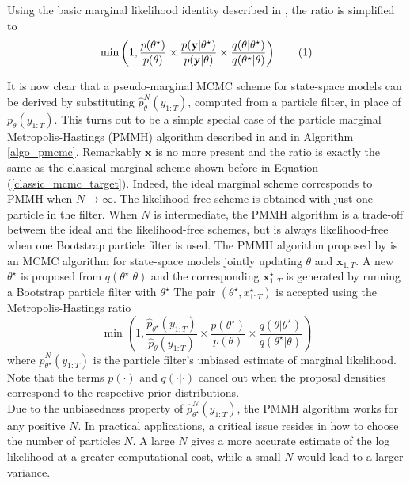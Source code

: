 \documentclass[11pt,a4,twosided,singlespacing,titlepagenumber=on]{scrreprt}
\numberwithin{equation}{chapter} %
\theoremstyle{remark}
\newcommand{\matr}[1]{\mathbf{#1}}
\newcommand\numberthis{\addtocounter{equation}{1}\tag{\theequation}}
\begin{document}
Using the basic marginal likelihood identity described in \cite{chib1995}, the ratio is simplified to
\begin{align*}
 \min \left(1, \frac{p(\theta^\star)}{p(\theta)}  \times \frac{p(\matr{y}|\theta^\star)}{p(\matr{y}|\theta)} \times \frac{q(\theta|\theta^\star)}{q(\theta^\star|\theta)} \right) \numberthis
\end{align*}

It is now clear that a pseudo-marginal MCMC scheme for state-space models can be derived by substituting $\hat{p}^N_{\theta}(y_{1:T})$, computed from a particle filter, in place of $p_{\theta}(y_{1:T})$. This turns out to be a simple special case of the particle marginal Metropolis-Hastings (PMMH) algorithm described in \cite{andrieu2010} and in Algorithm \ref{algo_pmcmc}. Remarkably $\matr{x}$ is no more present and the ratio is exactly the same as the classical marginal scheme shown before in Equation (\ref{classic_mcmc_target}). Indeed, the ideal marginal scheme corresponds to PMMH when $N \rightarrow \infty$. The likelihood-free scheme is obtained with just one particle in the filter. When $N$ is intermediate, the PMMH algorithm is a trade-off between the ideal and the likelihood-free schemes, but is always likelihood-free when one Bootstrap particle filter is used. The PMMH algorithm proposed by \cite{andrieu2010} is an MCMC algorithm for state-space models jointly updating $\theta$ and $\matr{x}_{1:T}$. A new $\theta^\star$ is proposed from $q(\theta^\star|\theta)$  and the corresponding $\matr{x}_{1:T}^\star$ is generated by running a Bootstrap particle filter with $\theta^\star$ The pair $(\theta^\star,x_{1:T}^\star)$ is accepted using the Metropolis-Hastings ratio
\begin{equation}
\min \left(1, \frac{\hat{p}_{\theta^\star}(y_{1:T})}{\hat{p}_{\theta}(y_{1:T})} \times \frac{p(\theta^\star)}{p(\theta)} \times \frac{q(\theta|\theta^\star)}{q(\theta^\star|\theta)} \right)
\end{equation} 
where $\hat{p}^N_{\theta^\star}(y_{1:T})$ is the particle filter's unbiased estimate of marginal likelihood. Note that the terms $p(\cdot)$ and $q(\cdot|\cdot)$ cancel out when the proposal densities correspond to the respective prior distributions. \\

Due to the unbiasedness property of $\hat{p}^N_{\theta^\star}(y_{1:T})$, the PMMH algorithm works for any positive $N$. In practical applications, a critical issue resides in how to choose the number of particles $N$. A large $N$ gives a more accurate estimate of the log likelihood at a greater computational cost, while a small $N$ would lead to a larger variance.
\end{document}
